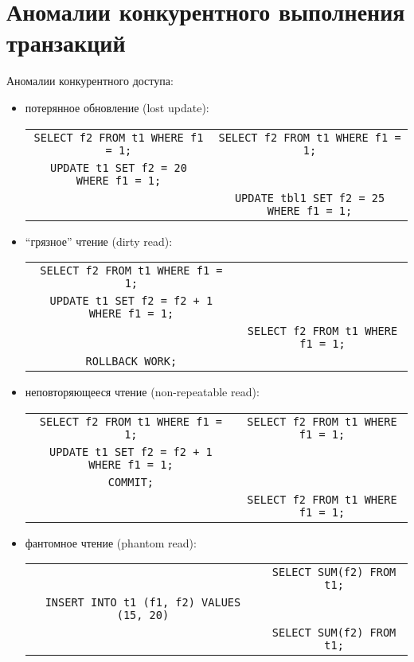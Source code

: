 \section{Аномалии конкурентного выполнения транзакций}

Аномалии конкурентного доступа:
\begin{itemize}
	\item потерянное обновление (lost update): \\
		\begin{tabular}{c | c}
			\texttt{SELECT f2 FROM t1 WHERE f1 = 1;} & \texttt{SELECT f2 FROM t1 WHERE f1 = 1;} \\
			\texttt{UPDATE t1 SET f2 = 20 WHERE f1 = 1;} & \\
															  & \texttt{UPDATE tbl1 SET f2 = 25 WHERE f1 = 1;}
		\end{tabular}
	\item ``грязное'' чтение (dirty read): \\
		\begin{tabular}{c | c}
			\texttt{SELECT f2 FROM t1 WHERE f1 = 1;} & \\
			\texttt{UPDATE t1 SET f2 = f2 + 1 WHERE f1 = 1;} & \\
																	  & \texttt{SELECT f2 FROM t1 WHERE f1 = 1;} \\
			\texttt{ROLLBACK WORK;}
		\end{tabular}
	\item неповторяющееся чтение (non-repeatable read): \\
		\begin{tabular}{c | c}
			\texttt{SELECT f2 FROM t1 WHERE f1 = 1;} & \texttt{SELECT f2 FROM t1 WHERE f1 = 1;} \\
			\texttt{UPDATE t1 SET f2 = f2 + 1 WHERE f1 = 1;} & \\
			\texttt{COMMIT;} & \\
									  & \texttt{SELECT f2 FROM t1 WHERE f1 = 1;}
		\end{tabular}
	\item фантомное чтение (phantom read): \\
		\begin{tabular}{c | c}
			& \texttt{SELECT SUM(f2) FROM t1;} \\
			\texttt{INSERT INTO t1 (f1, f2) VALUES (15, 20)} & \\
																	  & \texttt{SELECT SUM(f2) FROM t1;}
		\end{tabular}
\end{itemize}

